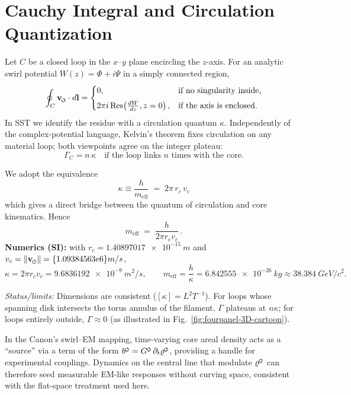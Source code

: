 \documentclass[reprint,aps,onecolumn,nofootinbib]{revtex4-2}
\newcommand{\swirlarrow}{%
    \mathchoice{\mkern-2mu\scriptstyle\boldsymbol{\circlearrowleft}}%
    {\mkern-2mu\scriptstyle\boldsymbol{\circlearrowleft}}%
    {\mkern-2mu\scriptscriptstyle\boldsymbol{\circlearrowleft}}%
    {\mkern-2mu\scriptscriptstyle\boldsymbol{\circlearrowleft}}%
}
\newcommand{\vswirl}{\mathbf{v}_{\swirlarrow}}
\begin{document}
\section{Cauchy Integral and Circulation Quantization}
        Let $C$ be a closed loop in the $x$–$y$ plane encircling the $z$-axis. For an analytic swirl potential $W(z)=\Phi+i\Psi$ in a simply connected region,
        \begin{equation}
        \oint_C \vswirl \cdot d\mathbf{l} =
        \begin{cases}
        0, & \text{if no singularity inside,}\\[4pt]
        2\pi i\, \mathrm{Res}\!\left(\frac{dW}{dz}, z=0\right), & \text{if the axis is enclosed.}
        \end{cases}
        \end{equation}
        In SST we identify the residue with a circulation quantum $\kappa$. Independently of the complex-potential language, Kelvin’s theorem fixes circulation on any material loop; both viewpoints agree on the integer plateau:
        \begin{equation}
        \Gamma_C = n\,\kappa \quad \text{if the loop links $n$ times with the core.}
        \end{equation}

        \begin{tcolorbox}[title=\textbf{Canonical identification of $\kappa$ (SST)}]
        We adopt the equivalence
        \[
            \boxed{\;\kappa \equiv \frac{h}{m_{\text{eff}}} \;=\; 2\pi\, r_c\, v_c\;}
        \]
        which gives a direct bridge between the quantum of circulation and core kinematics. Hence
        \[
            m_{\text{eff}} \;=\; \frac{h}{2\pi r_c v_c}\,.
        \]
        \textbf{Numerics (SI):} with $r_c=\qty{1.40897017e-15}{m}$ and $v_c=\lVert \mathbf{v}_{\swirlarrow}\rVert=\qty{1.09384563e6}{m/s}$,
        \[
            \kappa=2\pi r_c v_c=\qty{9.6836192e-9}{m^2/s},\qquad
            m_{\text{eff}}=\frac{h}{\kappa}=\qty{6.842555e-26}{kg}\approx\qty{38.384}{GeV/c^2}.
        \]
        \end{tcolorbox}

        \noindent\emph{Status/limits:} Dimensions are consistent ($[\kappa]=L^2T^{-1}$). For loops whose spanning disk intersects the torus annulus of the filament, $\Gamma$ plateaus at $n\kappa$; for loops entirely outside, $\Gamma\approx 0$ (as illustrated in Fig.~\ref{fig:fourpanel-3D-cartoon}).

        \begin{tcolorbox}[title=\textbf{Swirl–EM correspondence (operational note)}]
        In the Canon’s swirl–EM mapping, time-varying core areal density acts as a “source” via a term of the form $b^{\swirlarrow}=G^{\swirlarrow}\,\partial_t \varrho^{\swirlarrow}$, providing a handle for experimental couplings. Dynamics on the central line that modulate $\varrho^{\swirlarrow}$ can therefore seed measurable EM-like responses without curving space, consistent with the flat-space treatment used here.
        \end{tcolorbox}
\end{document}
